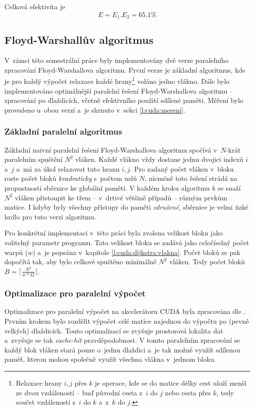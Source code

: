 

Celková efektivita je 
$$ E = E_1 . E_2 = 65.1 \% $$




\subsection{Floyd-Warshallův algoritmus}
V~rámci této semestrální práce byly implementovány dvě verze paralelního zpracování Floyd-Warshallova algoritmu. 
První verze je základní algoritmus, kde je pro každý výpočet relaxace každé hrany\footnote{Relaxace hrany $i,j$ přes $k$ je operace, 
kde se do matice délky cest uloží menší ze dvou vzdáleností -- buď původní cesta z~$i$ do $j$ nebo cesta
přes $k$, tedy součet vzdáleností z~$i$ do $k$ a~z~$k$ do $j$.} voláno jedno vlákno. Dále bylo implementováno 
optimálnější paralelní řešení Floyd-Warshallova algoritmu -- zpracování po dlaždicích, včetně efektivního použití sdílené paměti.
Měření bylo provedeno u~obou verzí a~je shrnuto v~sekci \ref{l:cuda:mereni}.

\subsubsection{Základní paralelní algoritmus}
Základní naivní paralelní řešení Floyd-Warshallova algoritmu spočívá v~$N$-krát paralelním spuštění $N^2$ vláken. 
Každé vlákno vždy dostane jednu dvojici indexů $i$ a~$j$ a~má za úkol relaxovat tuto hranu $i,j$. Pro zadaný počet vláken
v~bloku roste počet bloků \emph{kvadraticky} s~počtem uzlů $N$, nicméně toto řešení strádá na propustnosti sběrnice
ke globální paměti. V každém kroku algoritmu $k$ se snaží $N^2$ vláken přistoupit ke třem -- v~drtivé většině případů -- 
různým prvkům matice. I kdyby byly všechny přístupy do paměti \emph{združené}, sběrnice je velmi úzké hrdlo pro tuto verzi
algoritmu.


Pro konkrétní implementaci v~této práci byla zvolena velikost bloku jako volitelný parametr programu. Tato velikost bloku se zadává
jako celočíselný počet warpů ($w$) a~je popsána v~kapitole \ref{l:cuda:dijkstra:vlakna}.
Počet bloků se pak dopočítá tak, aby bylo celkově spuštěno minimálně $N^2$ vláken. Tedy počet bloků $B = \lceil \frac{N^2}{w*32} \rceil$.

\subsubsection{Optimalizace pro paralelní výpočet} \label{l:cuda:optimalizace}
Optimalizace pro paralelní výpočet na akcelerátoru CUDA byla zpracována dle \cite{w:fw:cuda}. Prvním krokem bylo rozdělit výpočet  celé matice najednou do výpočtu po (pevně velkých) dlaždicích. Touto optimalizací se zvyšuje prostorová lokalita dat a~zvyšuje se tak \emph{cache-hit} pravděpodobnost. V tomto paralelním zpracování se každý blok vláken stará pouze o~jednu dlaždici a~je tak možné využít sdílenou paměť, kterou mohou společně využít všechna vlákna v~jednom bloku.

